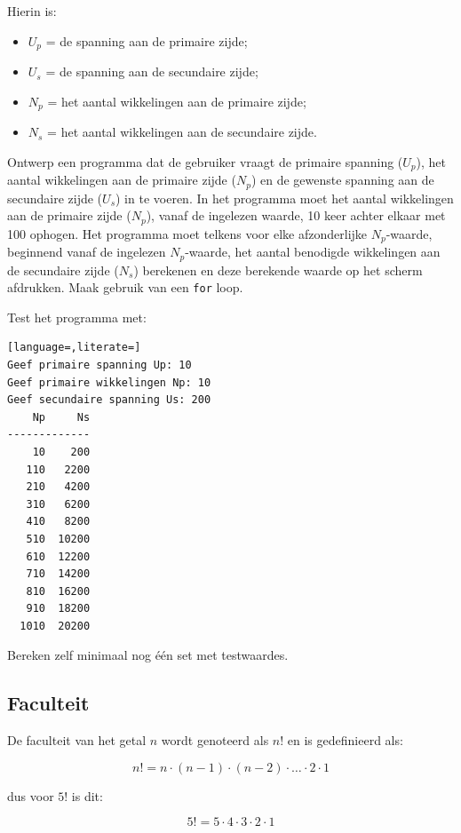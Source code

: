 \documentclass[a4paper,10pt,fleqn,twoside]{article}
\begin{document}
Hierin is:
\begin{itemize}
\item $U_p$ = de spanning aan de primaire zijde;
\item $U_s$ = de spanning aan de secundaire zijde;
\item $N_p$ = het aantal wikkelingen aan de primaire zijde;
\item $N_s$ = het aantal wikkelingen aan de secundaire zijde.
\end{itemize}

Ontwerp een programma dat de gebruiker vraagt de primaire spanning ($U_p$), het aantal wikkelingen aan de primaire zijde ($N_p$) en de gewenste spanning aan de secundaire zijde ($U_s$) in te voeren. In het programma moet het aantal wikkelingen aan de primaire zijde ($N_p$), vanaf de ingelezen waarde, 10 keer achter elkaar met 100 ophogen. Het programma moet telkens voor elke afzonderlijke $N_p$-waarde, beginnend vanaf de ingelezen $N_p$-waarde, het aantal benodigde wikkelingen aan de secundaire zijde ($N_s$) berekenen en deze berekende waarde op het scherm afdrukken. Maak gebruik van een \lstinline|for| loop.

Test het programma met:

\begin{lstlisting}[language=,literate=]
Geef primaire spanning Up: 10
Geef primaire wikkelingen Np: 10
Geef secundaire spanning Us: 200
    Np     Ns
-------------
    10    200
   110   2200
   210   4200
   310   6200
   410   8200
   510  10200
   610  12200
   710  14200
   810  16200
   910  18200
  1010  20200
\end{lstlisting}


Bereken zelf minimaal nog één set met testwaardes.

\subsection{Faculteit}
De faculteit van het getal $n$ wordt genoteerd als $n!$ en is gedefinieerd als:

\begin{equation*}
n! = n\cdot (n-1)\cdot (n-2)\cdot\ldots\cdot2\cdot1
\end{equation*}

dus voor $5!$ is dit:

\begin{equation*}
5! = 5\cdot4\cdot3\cdot2\cdot1
\end{equation*}
\end{document}
